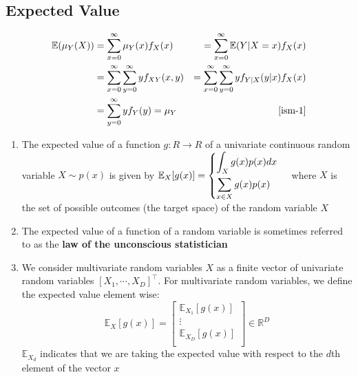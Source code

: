 \subsection{Expected Value \cite{ism-1,mfml-1}}\label{Multivariate Distributions: Expected Value}
\begin{align*}
    \mathbb{E}(\mu_Y(X))
    &= \displaystyle\sum_{x=0}^{\infty} \mu_Y(x)f_X(x)
    &= \displaystyle\sum_{x=0}^{\infty} 
        \mathbb{E}(Y|X=x)f_X(x) \\
    &= \displaystyle\sum_{x=0}^{\infty}
        \displaystyle\sum_{y=0}^{\infty} yf_{XY}(x,y)
    &= \displaystyle\sum_{x=0}^{\infty}
        \displaystyle\sum_{y=0}^{\infty} yf_{Y|X}(y|x)f_X(x) \\
    &= \displaystyle\sum_{y=0}^{\infty} yf_Y(y) = \mu_Y
    & \text{\cite{ism-1}}
\end{align*}


\begin{enumerate}
    \item The expected value of a function $g : R \to R$ of a univariate continuous random variable $X \sim p(x)$ is given by $
        \mathbb{E}_X[g(x)] = 
        \begin{cases}
            \displaystyle\int_X g(x)p(x)dx \\[2ex]
            \displaystyle\sum_{x\in X} g(x)p(x)
        \end{cases}
    $ where $X$ is the set of possible outcomes (the target space) of the random variable $X$

    \item The expected value of a function of a random variable is sometimes referred to as the \textbf{law of the unconscious statistician}

    \item We consider multivariate random variables $X$ as a finite vector of univariate random variables $[X_1, \cdots , X_D]^\top$. For multivariate random variables, we define the expected value element wise:
    \[
        \mathbb{E}_X[g(x)]
        = \begin{bmatrix}
            \mathbb{E}_{X_1}[g(x)] \\
            \vdots \\
            \mathbb{E}_{X_D}[g(x)] \\
        \end{bmatrix} \in \mathbb{R}^D
    \]
    $\mathbb{E}_{X_d}$ indicates that we are taking the expected value with respect to the $d$th element of the vector $x$


\end{enumerate}
